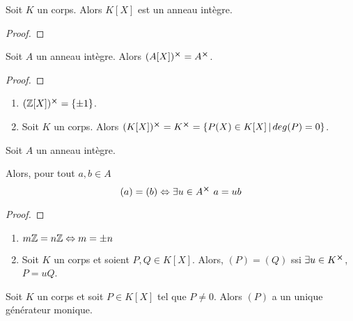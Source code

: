 \begin{corollary}
	Soit $K$ un corps. Alors $K[X]$ est un anneau intègre.
\end{corollary}

\ifdefined\outputproof
\begin{proof}

\end{proof}
\fi

\begin{proposition}
	Soit $A$ un anneau intègre. Alors $(A[X])^{\cross} = A^{\cross}$.
\end{proposition}

\ifdefined\outputproof
\begin{proof}

\end{proof}
\fi

\begin{exemple}
	\begin{enumerate}
		\item $(\mathbb{Z}[X])^{\cross} = \left\{ \pm 1 \right\}$.
		\item Soit $K$ un corps. Alors $(K[X])^{\cross} = K^{\cross} =
			\left\{P(X) \in K[X] \, | \, deg(P) = 0 \right\}$.
	\end{enumerate}
\end{exemple}

\begin{proposition}
	Soit $A$ un anneau intègre.

	Alors, pour tout $a, b \in A$
	\begin{equation}
		(a) = (b) \Leftrightarrow \exists u \in A^{\cross} \, \, a = ub
	\end{equation}
\end{proposition}

\ifdefined\outputproof
\begin{proof}

\end{proof}
\fi

\begin{exemple}
	\begin{enumerate}
		\item $m \mathbb{Z} = n \mathbb{Z} \Leftrightarrow m = \pm n$
		\item Soit $K$ un corps et soient $P, Q \in K[X]$. Alors, $(P) = (Q)$
			ssi $\exists u \in K^{\cross}$, $P = u Q$.
	\end{enumerate}
\end{exemple}

\begin{corollary}
	Soit $K$ un corps et soit $P \in K[X]$ tel que $P \neq 0$. Alors $(P)$ a un
	unique générateur monique.
\end{corollary}

